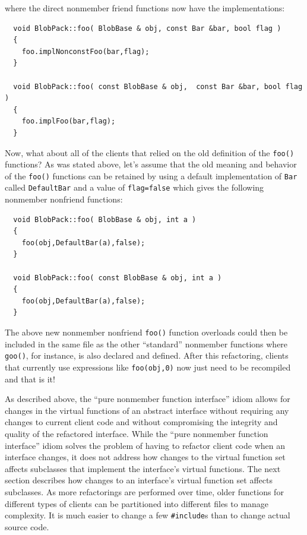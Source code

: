 \documentclass[pdf,ps2pdf,11pt]{SANDreport}
\begin{document}
{}\noindent{}where the direct nonmember friend functions now have the
implementations:

{\small\begin{verbatim}
  void BlobPack::foo( BlobBase & obj, const Bar &bar, bool flag )
  {
    foo.implNonconstFoo(bar,flag);
  }

  void BlobPack::foo( const BlobBase & obj,  const Bar &bar, bool flag )
  {
    foo.implFoo(bar,flag);
  }
\end{verbatim}}

Now, what about all of the clients that relied on the old definition of the
{}\texttt{foo()} functions?  As was stated above, let's assume that the old
meaning and behavior of the {}\texttt{foo()} functions can be retained by
using a default implementation of {}\texttt{Bar} called {}\texttt{DefaultBar}
and a value of {}\texttt{flag=false} which gives the following nonmember
nonfriend functions:

{\small\begin{verbatim}
  void BlobPack::foo( BlobBase & obj, int a )
  {
    foo(obj,DefaultBar(a),false);
  }

  void BlobPack::foo( const BlobBase & obj, int a )
  {
    foo(obj,DefaultBar(a),false);
  }
\end{verbatim}}

The above new nonmember nonfriend {}\texttt{foo()} function overloads could
then be included in the same file as the other ``standard'' nonmember
functions where {}\texttt{goo()}, for instance, is also declared and defined.
After this refactoring, clients that currently use expressions like
{}\texttt{foo(obj,0)} now just need to be recompiled and that is it!

As described above, the ``pure nonmember function interface'' idiom allows for
changes in the virtual functions of an abstract interface without requiring
any changes to current client code and without compromising the integrity and
quality of the refactored interface.  While the ``pure nonmember function
interface'' idiom solves the problem of having to refactor client code when an
interface changes, it does not address how changes to the virtual function set
affects subclasses that implement the interface's virtual functions.  The next
section describes how changes to an interface's virtual function set affects
subclasses.  As more refactorings are performed over time, older functions for
different types of clients can be partitioned into different files to manage
complexity.  It is much easier to change a few {}\texttt{\#include}s than to
change actual source code.
\end{document}
